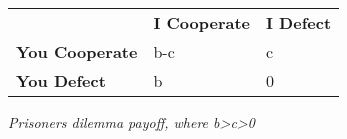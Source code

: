 \begin{table}[h]
\begin{tabular}{lll}
             & \textbf{I Cooperate} & \textbf{I Defect} \\
\textbf{You Cooperate} & b-c         & c        \\
\textbf{You Defect}    & b           & 0       
\end{tabular}
\end{table}

\textit{Prisoners dilemma payoff, where b>c>0}